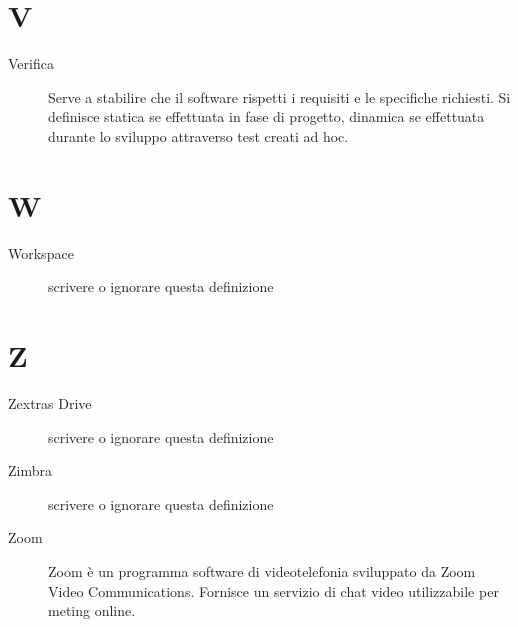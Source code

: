 \documentclass[a4paper, oneside]{article}
\begin{document}
\section{V}
\begin{description}
  \item[Verifica] Serve a stabilire che il software rispetti i requisiti e le specifiche richiesti. Si definisce statica se effettuata in fase di progetto, dinamica se effettuata durante lo sviluppo attraverso test creati ad hoc.
\end{description}
\newpage
\section{W}
\begin{description}
  \item[Workspace] {scrivere o ignorare questa definizione}
\end{description}
\newpage
\section{Z}
\begin{description}
  \item[Zextras Drive] {scrivere o ignorare questa definizione}
  \item[Zimbra] {scrivere o ignorare questa definizione}
  \item[Zoom] Zoom è un programma software di videotelefonia sviluppato da Zoom Video Communications. Fornisce un servizio di chat video utilizzabile per meting online.
\end{description}
\newpage
\end{document}
